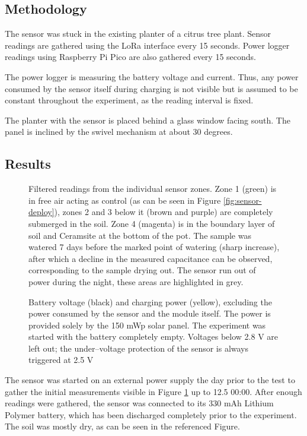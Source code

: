 \subsection{Methodology}
The sensor was stuck in the existing planter of a citrus tree plant. Sensor readings are gathered using the LoRa interface every 15 seconds. Power logger readings using Raspberry Pi Pico are also gathered every 15 seconds. 

The power logger is measuring the battery voltage and current. Thus, any power consumed by the sensor itself during charging is not visible but is assumed to be constant throughout the experiment, as the reading interval is fixed.

The planter with the sensor is placed behind a glass window facing south. The panel is inclined by the swivel mechanism at about 30 degrees.

\subsection{Results}
\begin{figure}[p]
    
    \caption{\label{fig:sensor-log}Filtered readings from the individual sensor zones. Zone 1 (green) is in free air acting as control (as can be seen in Figure \ref{fig:sensor-deploy}), zones 2 and 3 below it (brown and purple) are completely submerged in the soil. Zone 4 (magenta) is in the boundary layer of soil and Ceramsite at the bottom of the pot. The sample was watered 7 days before the marked point of watering (sharp increase), after which a decline in the measured capacitance can be observed, corresponding to the sample drying out. The sensor run out of power during the night, these areas are highlighted in grey.}
\end{figure}
\begin{figure}[p]
    
    \caption{\label{fig:power-log}Battery voltage (black) and charging power (yellow), excluding the power consumed by the sensor and the module itself. The power is provided solely by the 150 mWp solar panel. The experiment was started with the battery completely empty. Voltages below 2.8 V are left out; the under--voltage protection of the sensor is always triggered at 2.5 V}
\end{figure}

The sensor was started on an external power supply the day prior to the test to gather the initial measurements visible in Figure \ref{fig:sensor-log} up to 12.5 00:00. After enough readings were gathered, the sensor was connected to its 330 mAh Lithium Polymer battery, which has been discharged completely prior to the experiment. The soil was mostly dry, as can be seen in the referenced Figure.

